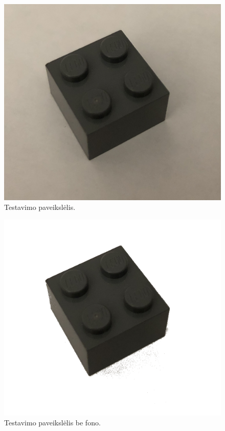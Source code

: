 \documentclass{VUMIFInfKursinis}
\begin{document}
\begin{enumerate}
    \vspace{10mm}
    \begin{figure}[h!]
    \centering
      \includegraphics[scale=0.15]{img/lego_test_1}
      \caption{Testavimo paveikslėlis.}
      \label{fig:Lego_Test_1}
    \end{figure}
    
    \begin{figure}[h!]
    \centering
      \includegraphics[scale=0.1]{img/lego_test_2}
      \caption{Testavimo paveikslėlis be fono.}
      \label{fig:Lego_Test_2}
    \end{figure}
    

\end{enumerate}
\end{document}
